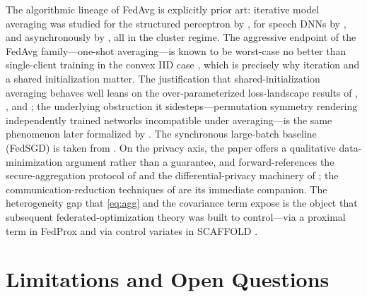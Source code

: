 \documentclass[11pt]{article}
\begin{document}
The algorithmic lineage of FedAvg is explicitly prior art: iterative model averaging was studied for the structured perceptron by \citet{mcdonald2010distributed}, for speech DNNs by \citet{povey2015parallel}, and asynchronously by \citet{zhang2015elastic}, all in the cluster regime. The aggressive endpoint of the FedAvg family---one-shot averaging---is known to be worst-case no better than single-client training in the convex IID case \citep{zhang2012communication,zinkevich2010parallelized}, which is precisely why iteration and a shared initialization matter. The justification that shared-initialization averaging behaves well leans on the over-parameterized loss-landscape results of \citet{goodfellow2015qualitatively}, \citet{dauphin2014identifying}, and \citet{choromanska2015loss}; the underlying obstruction it sidesteps---permutation symmetry rendering independently trained networks incompatible under averaging---is the same phenomenon later formalized by \citet{ainsworth2023gitrebasin}. The synchronous large-batch baseline (FedSGD) is taken from \citet{chen2016revisiting}. On the privacy axis, the paper offers a qualitative data-minimization argument rather than a guarantee, and forward-references the secure-aggregation protocol of \citet{bonawitz2017secure} and the differential-privacy machinery of \citet{abadi2016deep}; the communication-reduction techniques of \citet{konecny2016strategies} are its immediate companion. The heterogeneity gap that \eqref{eq:agg} and the covariance term expose is the object that subsequent federated-optimization theory was built to control---via a proximal term in FedProx \citep{li2020fedprox} and via control variates in SCAFFOLD \citep{karimireddy2020scaffold}.

\section{Limitations and Open Questions}
\end{document}
